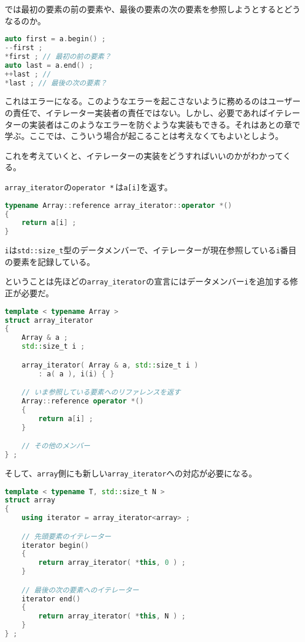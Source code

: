 では最初の要素の前の要素や、最後の要素の次の要素を参照しようとするとどうなるのか。

\begin{lstlisting}[language={C++}]
auto first = a.begin() ;
--first ;
*first ; // 最初の前の要素？
auto last = a.end() ;
++last ; //
*last ; // 最後の次の要素？
\end{lstlisting}

これはエラーになる。このようなエラーを起こさないように務めるのはユーザーの責任で、イテレーター実装者の責任ではない。しかし、必要であればイテレーターの実装者はこのようなエラーを防ぐような実装もできる。それはあとの章で学ぶ。ここでは、こういう場合が起こることは考えなくてもよいとしよう。

これを考えていくと、イテレーターの実装をどうすればいいのかがわかってくる。

\texttt{array\_iterator}の\texttt{operator *}\,は\texttt{a[i]}を返す。

\begin{lstlisting}[language={C++}]
typename Array::reference array_iterator::operator *()
{
    return a[i] ;
}
\end{lstlisting}

\texttt{i}は\texttt{std::size\_t}型のデータメンバーで、イテレーターが現在参照している\texttt{i}番目の要素を記録している。

ということは先ほどの\texttt{array\_iterator}の宣言にはデータメンバー\texttt{i}を追加する修正が必要だ。

\begin{lstlisting}[language={C++}]
template < typename Array >
struct array_iterator
{
    Array & a ;
    std::size_t i ;

    array_iterator( Array & a, std::size_t i )
        : a( a ), i(i) { }

    // いま参照している要素へのリファレンスを返す
    Array::reference operator *()
    {
        return a[i] ;
    }

    // その他のメンバー
} ;
\end{lstlisting}

そして、\texttt{array}側にも新しい\texttt{array\_iterator}への対応が必要になる。

\begin{lstlisting}[language={C++}]
template < typename T, std::size_t N >
struct array
{
    using iterator = array_iterator<array> ;

    // 先頭要素のイテレーター
    iterator begin()
    {
        return array_iterator( *this, 0 ) ;
    }

    // 最後の次の要素へのイテレーター
    iterator end()
    {
        return array_iterator( *this, N ) ;
    }
} ;
\end{lstlisting}


